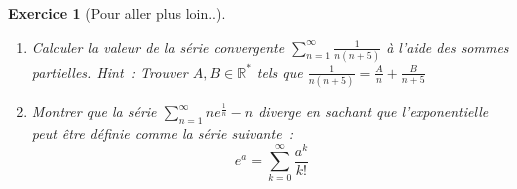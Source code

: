 \documentclass[11.5pt,french,table]{article}
\newcommand{\enumeratelinefix}{\leavevmode \vspace{-\baselineskip}} %
\theoremstyle{exercice}
\newtheorem{exercice}{Exercice}
\begin{document}
\begin{exercice}[Pour aller plus loin..]
\enumeratelinefix
\begin{enumerate}
    \item Calculer la valeur de la série convergente $\displaystyle\sum_{n=1}^\infty \frac{1}{n(n+5)}$ à l'aide des sommes partielles. \newline
    \emph{Hint~: Trouver $A, B \in \mathbb{R}^*$ tels que $\frac{1}{n(n+5)} = \frac{A}{n} + \frac{B}{n+5}$}
    
    \item Montrer que la série $\displaystyle\sum_{n=1}^\infty ne^{\frac{1}{n}} - n$ diverge en sachant que l'exponentielle peut être définie comme la série suivante~:
    \[
    e^a = \displaystyle\sum_{k=0}^\infty \frac{a^k}{k!}
    \]
\end{enumerate}
\end{exercice}
\end{document}
